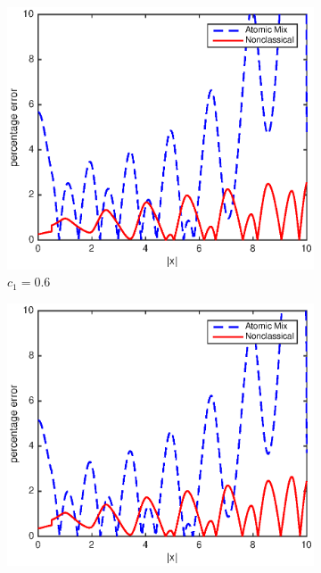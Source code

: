 \documentclass[12pt]{article}
\begin{document}
{\begin{figure}[p]
    \centering
    \begin{subfigure}{0.495\textwidth}
        \centering
        \includegraphics[width=\textwidth]{NSE_err_A60.eps}
        \caption{$c_1 = 0.6$}
        \label{figerrA60}
    \end{subfigure}
    \hfill
    \begin{subfigure}{0.495\textwidth}
        \centering
        \includegraphics[width=\textwidth]{NSE_err_A70.eps}

\end{subfigure}
\end{figure}}
\end{document}
